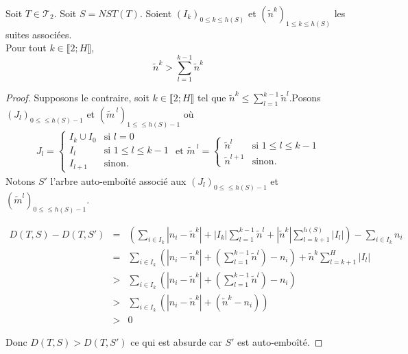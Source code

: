 \begin{lem}
  \label{lem9}
  Soit $T \in \mathcal{T}_{2}$. Soit $S = NST(T)$.  Soient
  $(I_{k})_{0 \leqslant k \leqslant h(S)}$ et
  $(\tilde{n}^{k})_{1 \leqslant k \leqslant h(S)}$ les suites
  associées.\\
  Pour tout $k \in \llbracket 2;H \rrbracket$, $$\tilde{n}^{k} > \sum_{l=1}^{k-1}\tilde{n}^{k}$$
    \begin{proof}
      Supposons le contraire, soit $k \in \llbracket 2;H \rrbracket$
      tel que
      $\tilde{n}^{k} \leqslant \sum_{l= 1}^{k-1} \tilde{n}^{l}$.Posons
      $(J_{l})_{0 \leqslant \leqslant h(S)-1}$ et
      $(\tilde{m}^{\ l})_{1 \leqslant \leqslant h(S)-1}$ où
    \begin{align*}
      J_{l} =
      \begin{cases}
        I_{k} \cup I_{0} &\mbox{si } l=0\\       
        I_{l} &\mbox{si } 1 \leqslant l \leqslant k-1\\
        I_{l+1} &\mbox{sinon.}
      \end{cases}
                  \text{ et } \tilde{m}^{\ l} =
                  \begin{cases}
                    \tilde{n}^{l} &\mbox{si } 1 \leqslant l \leqslant k-1\\
                    \tilde{n}^{l+1} &\mbox{sinon.}
                  \end{cases}
    \end{align*}
    Notons $S'$ l'arbre auto-emboîté associé aux
    $(J_{l})_{0 \leqslant \leqslant h(S)-1}$ et
    $(\tilde{m}^{l})_{0 \leqslant \leqslant h(S)-1}$.
    \begin{center}
      $$
      \begin{array}{rcl}
        D(T,S) - D(T,S') &=& \left( \sum_{i \in I_{k}}
                             |n_{i}-\tilde{n}^{k}|+ |I_{k}|
                             \sum_{l=1}^{k-1} \tilde{n}^{l} + |\tilde{n}^{k}|
                             \sum_{l=k+1}^{h(S)} |I_{l}| \right) -
                             \sum_{i \in I_{k}} n_{i}  \\

                         &=& \sum_{i \in I_{k}} \left(|n_{i} -
                             \tilde{n}^{k}| +\left( \sum_{l=1}^{k-1}
                             \tilde{n}^{l} \right) - n_{i} \right) +
                             \tilde{n}^{k}\sum_{l=k+1}^{H} |I_{l}| \\
                         &>& \sum_{i \in I_{k}} \left(|n_{i} -
                             \tilde{n}^{k}| +\left( \sum_{l=1}^{k-1}
                             \tilde{n}^{l} \right) - n_{i}\right)\\
                         &>& \sum_{i \in I_{k}} \left(|n_{i} -
                             \tilde{n}^{k}| + (\tilde{n}^{k} - n_{i})\right)\\                         
                         &>& 0
      \end{array}
      $$
    \end{center}
    Donc $D(T,S) > D(T,S')$ ce qui est absurde car $S'$ est auto-emboîté.
  \end{proof}
\end{lem}

